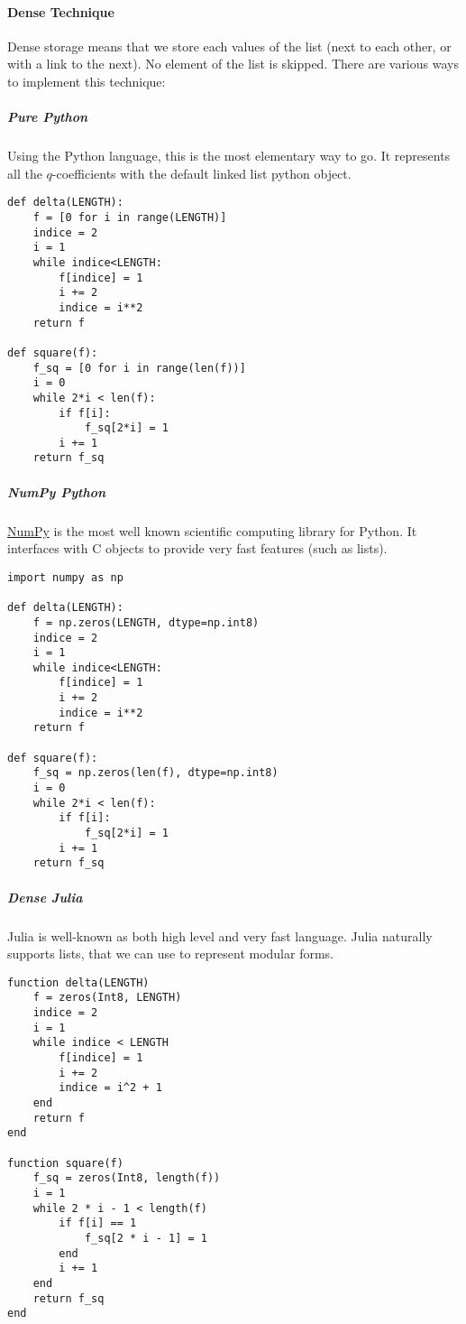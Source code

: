 \paragraph{Dense Technique}
Dense storage means that we store each values of the list (next to each other, or with a link to the next).
No element of the list is skipped.
There are various ways to implement this technique:
\subparagraph{Pure Python}
Using the Python language, this is the most elementary way to go.
It represents all the $q$-coefficients with the default linked list python object.
\begin{verbatim}
def delta(LENGTH):
	f = [0 for i in range(LENGTH)]
	indice = 2
	i = 1
	while indice<LENGTH:
		f[indice] = 1
		i += 2
		indice = i**2
	return f

def square(f):
	f_sq = [0 for i in range(len(f))]
	i = 0
	while 2*i < len(f):
		if f[i]:
			f_sq[2*i] = 1
		i += 1
	return f_sq
\end{verbatim}
\subparagraph{NumPy Python}
\href{https://fr.wikipedia.org/wiki/NumPy}{NumPy} is the most well known scientific computing library for Python.
It interfaces with C objects to provide very fast features (such as lists).
\begin{verbatim}
import numpy as np

def delta(LENGTH):
	f = np.zeros(LENGTH, dtype=np.int8)
	indice = 2
	i = 1
	while indice<LENGTH:
		f[indice] = 1
		i += 2
		indice = i**2
	return f

def square(f):
	f_sq = np.zeros(len(f), dtype=np.int8)
	i = 0
	while 2*i < len(f):
		if f[i]:
			f_sq[2*i] = 1
		i += 1
	return f_sq
\end{verbatim}
\subparagraph{Dense Julia}
Julia is well-known as both high level and very fast language.
Julia naturally supports lists, that we can use to represent modular forms.
\begin{verbatim}
function delta(LENGTH)
	f = zeros(Int8, LENGTH)
	indice = 2
	i = 1
	while indice < LENGTH
		f[indice] = 1
		i += 2
		indice = i^2 + 1
	end
	return f
end

function square(f)
	f_sq = zeros(Int8, length(f))
	i = 1
	while 2 * i - 1 < length(f)
		if f[i] == 1
			f_sq[2 * i - 1] = 1
		end
		i += 1
	end
	return f_sq
end
\end{verbatim}

